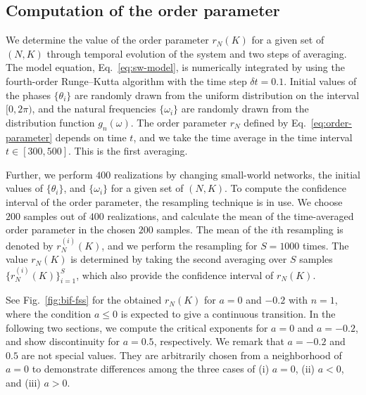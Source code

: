\subsection{Computation of the order parameter}

We determine the value of the order parameter $r_{N}(K)$
for a given set of $(N,K)$
through temporal evolution of the system and
two steps of averaging.
The model equation, Eq.~\eqref{eq:sw-model},
is numerically integrated by using the fourth-order Runge--Kutta algorithm
with the time step $\delta t=0.1$.
Initial values of the phases $\{\theta_{i}\}$
are randomly drawn from the uniform distribution on the interval $[0,2\pi)$,
and the natural frequencies $\{\omega_{i}\}$ are randomly drawn
from the distribution function $g_{n}(\omega)$.
The order parameter $r_{N}$ defined by Eq.~\eqref{eq:order-parameter}
depends on time $t$,
and we take the time average in the time interval $t\in [300,500]$.
This is the first averaging.

Further, we perform $400$ realizations by changing small-world networks,
the initial values of $\{\theta_{i}\}$, and $\{\omega_{i}\}$
for a given set of $(N,K)$.
To compute the confidence interval of the order parameter,
the resampling technique is in use.
We choose $200$ samples out of $400$ realizations,
and calculate the mean of the time-averaged order parameter
in the chosen $200$ samples.
The mean of the $i$th resampling is denoted by $r_{N}^{(i)}(K)$,
and we perform the resampling for $S=1000$ times.
The value $r_{N}(K)$ is determined by taking the second averaging
over $S$ samples $\{r_{N}^{(i)}(K)\}_{i=1}^{S}$,
which also provide the confidence interval of $r_{N}(K)$.


See Fig.~\ref{fig:bif-fss} for the obtained $r_{N}(K)$ for $a=0$ and $-0.2$ with $n=1$,
where the condition $a\leq 0$ is expected to give a continuous transition.
In the following two sections, we compute the critical exponents
for $a=0$ and $a=-0.2$,
and show discontinuity for $a=0.5$, respectively.
We remark that $a=-0.2$ and $0.5$ are not special values.
They are arbitrarily chosen from a neighborhood of $a=0$ to demonstrate
differences among the three cases of (i) $a=0$, (ii) $a<0$, and (iii) $a>0$.



